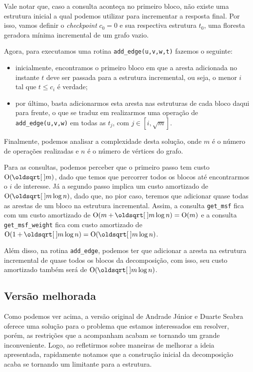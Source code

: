 Vale notar que, caso a consulta aconteça no primeiro bloco, não existe uma estrutura inicial a qual podemos utilizar para incrementar a resposta final. Por isso, vamos definir o \emph{checkpoint} $c_0 = 0$ e sua respectiva estrutura $t_0$, uma floresta geradora mínima incremental de um grafo vazio.

Agora, para executamos uma rotina \texttt{add\_edge(u,v,w,t)} fazemos o seguinte:

\begin{itemize}
    \item inicialmente, encontramos o primeiro bloco em que a aresta adicionada no instante $t$ deve ser passada para a estrutura incremental, ou seja, o menor $i$ tal que $t \leq c_i$ é verdade;
    \item por último, basta adicionarmos esta aresta nas estruturas de cada bloco daqui para frente, o que se traduz em realizarmos uma operação de \texttt{add\_edge(u,v,w)} em todas as $t_j$, com $j \in [i, \sqrt{m}]$.
\end{itemize}

Finalmente, podemos analisar a complexidade desta solução, onde $m$ é o número de operações realizadas e $n$ é o número de vértices do grafo.

Para as consultas, podemos perceber que o primeiro passo tem custo $\Oh(\sqrt{m})$, dado que temos que percorrer todos os blocos até encontrarmos o $i$ de interesse. Já a segundo passo implica um custo amortizado de $\Oh(\sqrt{m} \log n)$, dado que, no pior caso, teremos que adicionar quase todas as arestas de um bloco na estrutura incremental. Assim, a consulta \texttt{get\_msf} fica com um custo amortizado de $\Oh(m + \sqrt{m} \log n) = \Oh(m)$ e a consulta \texttt{get\_msf\_weight} fica com custo amortizado de $\Oh(1 + \sqrt{m} \log n) = \Oh(\sqrt{m} \log n)$.

Além disso, na rotina \texttt{add\_edge}, podemos ter que adicionar a aresta na estrutura incremental de quase todos os blocos da decomposição, com isso, seu custo amortizado também será de $\Oh(\sqrt{m} \log n)$.

\subsection{Versão melhorada}
\label{sec:rmsf-versao-mel}

Como podemos ver acima, a versão original de Andrade Júnior e Duarte Seabra oferece uma solução para o problema que estamos interessados em resolver, porém, as restrições que a acompanham acabam se tornando um grande inconveniente. Logo, ao refletirmos sobre maneiras de melhorar a ideia apresentada, rapidamente notamos que a construção inicial da decomposição acaba se tornando um limitante para a estrutura.

